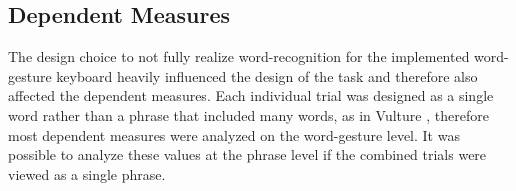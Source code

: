 \begin{table}[h] %
	\centering
	\caption[Pilot Study Schedule of Assessments]{\centering Schedule of Assessments for a single study visit (in minutes).}
	\label{pilot_schedule_of_assessments}
\end{table}

\subsection{Dependent Measures} \label{pilot_dependent_measures}
The design choice to not fully realize word-recognition for the implemented word-gesture keyboard heavily influenced the design of the task and therefore also affected the dependent measures. Each individual trial was designed as a single word rather than a phrase that included many words, as in Vulture \cite{ref_vulture}, therefore most dependent measures were analyzed on the word-gesture level. It was possible to analyze these values at the phrase level if the combined trials were viewed as a single phrase.

